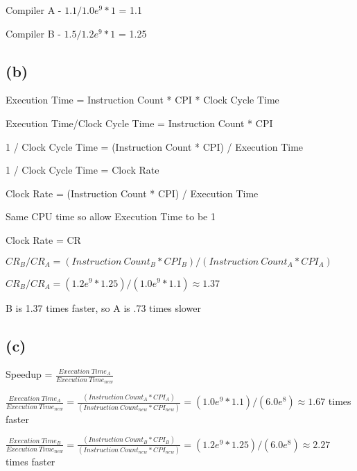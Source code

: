\documentclass{article}
\begin{document}
    \vspace*{6pt}

    Compiler A - $1.1 / {1.0e^9 * 1}$ = 1.1

    Compiler B - $ 1.5 / {1.2e^9 * 1}$ = 1.25

    \subsection*{(b)}

    Execution Time = Instruction Count * CPI * Clock Cycle Time

    Execution Time/Clock Cycle Time = Instruction Count * CPI

    1 / Clock Cycle Time = (Instruction Count * CPI) / Execution Time

    1 / Clock Cycle Time = Clock Rate

    Clock Rate = (Instruction Count * CPI) / Execution Time

    Same CPU time so allow Execution Time to be 1 

    Clock Rate = CR

    \vspace*{6pt}

    $CR_B/CR_A = (Instruction\ Count_B * CPI_B)/(Instruction\ Count_A * CPI_A)$ 

    $CR_B/CR_A = (1.2e^9 * 1.25)/(1.0e^9 * 1.1) \approx 1.37$

    B is 1.37 times faster, so A is .73 times slower



    \subsection*{(c)}

    Speedup = $\frac{Execution\ Time_A}{Execution\ Time_{new}}$

    \vspace*{6pt}
    
    $\frac{Execution\ Time_A}{Execution\ Time_{new}} = \frac{(Instruction\ Count_A * CPI_A)}{(Instruction\ Count_{new} * CPI_{new})} = (1.0e^9 * 1.1)/(6.0e^8) \approx 1.67$ times faster

    \vspace*{6pt}

    $\frac{Execution\ Time_B}{Execution\ Time_{new}} = \frac{(Instruction\ Count_B * CPI_B)}{(Instruction\ Count_{new} * CPI_{new})} = (1.2e^9 * 1.25)/(6.0e^8) \approx 2.27$ times faster

    \newpage
\end{document}
